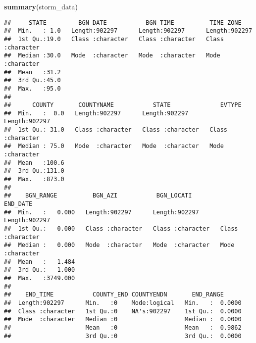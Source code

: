 \documentclass[
]{article}
\newenvironment{Shaded}{\begin{snugshade}}{\end{snugshade}}
\newcommand{\FunctionTok}[1]{\textcolor[rgb]{0.13,0.29,0.53}{\textbf{#1}}}
\newcommand{\NormalTok}[1]{#1}
\begin{document}
\begin{Shaded}
\begin{Highlighting}[]
\FunctionTok{summary}\NormalTok{(storm\_data)}
\end{Highlighting}
\end{Shaded}

\begin{verbatim}
##     STATE__       BGN_DATE           BGN_TIME          TIME_ZONE        
##  Min.   : 1.0   Length:902297      Length:902297      Length:902297     
##  1st Qu.:19.0   Class :character   Class :character   Class :character  
##  Median :30.0   Mode  :character   Mode  :character   Mode  :character  
##  Mean   :31.2                                                           
##  3rd Qu.:45.0                                                           
##  Max.   :95.0                                                           
##                                                                         
##      COUNTY       COUNTYNAME           STATE              EVTYPE         
##  Min.   :  0.0   Length:902297      Length:902297      Length:902297     
##  1st Qu.: 31.0   Class :character   Class :character   Class :character  
##  Median : 75.0   Mode  :character   Mode  :character   Mode  :character  
##  Mean   :100.6                                                           
##  3rd Qu.:131.0                                                           
##  Max.   :873.0                                                           
##                                                                          
##    BGN_RANGE          BGN_AZI           BGN_LOCATI          END_DATE        
##  Min.   :   0.000   Length:902297      Length:902297      Length:902297     
##  1st Qu.:   0.000   Class :character   Class :character   Class :character  
##  Median :   0.000   Mode  :character   Mode  :character   Mode  :character  
##  Mean   :   1.484                                                           
##  3rd Qu.:   1.000                                                           
##  Max.   :3749.000                                                           
##                                                                             
##    END_TIME           COUNTY_END COUNTYENDN       END_RANGE       
##  Length:902297      Min.   :0    Mode:logical   Min.   :  0.0000  
##  Class :character   1st Qu.:0    NA's:902297    1st Qu.:  0.0000  
##  Mode  :character   Median :0                   Median :  0.0000  
##                     Mean   :0                   Mean   :  0.9862  
##                     3rd Qu.:0                   3rd Qu.:  0.0000  

\end{verbatim}
\end{document}
